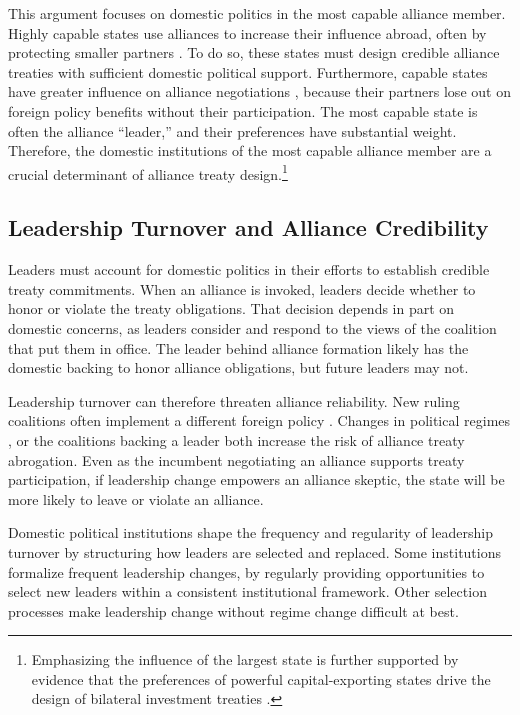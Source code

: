 \documentclass[12pt]{article}
\begin{document}
This argument focuses on domestic politics in the most capable alliance member. 
Highly capable states use alliances to increase their influence abroad, often by protecting smaller partners \citep{Morrow1994}. 
To do so, these states must design credible alliance treaties with sufficient domestic political support.
Furthermore, capable states have greater influence on alliance negotiations \citep{Mattes2012}, because their partners lose out on foreign policy benefits without their participation.
The most capable state is often the alliance ``leader,'' and their preferences have substantial weight. 
Therefore, the domestic institutions of the most capable alliance member are a crucial determinant of alliance treaty design.\footnote{Emphasizing the influence of the largest state is further supported by evidence that the preferences of powerful capital-exporting states drive the design of bilateral investment treaties \citep{AlleePeinhardt2014}.} 


\subsection{Leadership Turnover and Alliance Credibility}


Leaders must account for domestic politics in their efforts to establish credible treaty commitments.
When an alliance is invoked, leaders decide whether to honor or violate the treaty obligations. 
That decision depends in part on domestic concerns, as leaders consider and respond to the views of the coalition that put them in office. 
The leader behind alliance formation likely has the domestic backing to honor alliance obligations, but future leaders may not. 


Leadership turnover can therefore threaten alliance reliability.
New ruling coalitions often implement a different foreign policy \citep{Lobell2004, Narizny2007}.  
Changes in political regimes \citep{LeedsSavun2007}, or the coalitions backing a leader \citep{Leedsetal2009} both increase the risk of alliance treaty abrogation. 
Even as the incumbent negotiating an alliance supports treaty participation, if leadership change empowers an alliance skeptic, the state will be more likely to leave or violate an alliance.  


Domestic political institutions shape the frequency and regularity of leadership turnover by structuring how leaders are selected and replaced. 
Some institutions formalize frequent leadership changes, by regularly providing opportunities to select new leaders within a consistent institutional framework. 
Other selection processes make leadership change without regime change difficult at best. 
\end{document}
